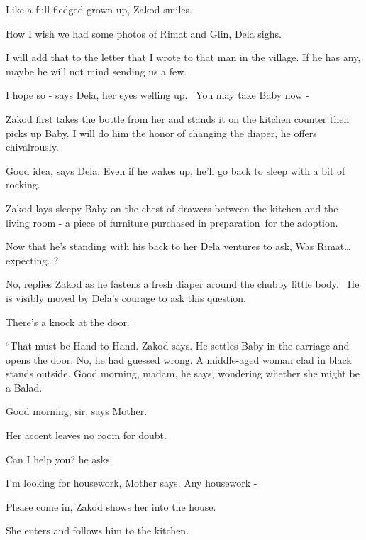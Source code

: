 \documentclass[letterpaper]{article}
\begin{document}
{\textquotedbl}Like a full-fledged grown up,{\textquotedbl} Zakod smiles. 

{\textquotedbl}How I wish we had some photos of Rimat and Glin,{\textquotedbl} Dela sighs.

{\textquotedbl}I will add that to the letter that I wrote to that man in the village. If he has any, maybe he will not
mind sending us a few.{\textquotedbl} 

{\textquotedbl}I hope so -{\textquotedbl} says Dela, her eyes welling up. ~{\textquotedbl}You may take Baby now
-{\textquotedbl} 

Zakod first takes the bottle from her and stands it on the kitchen counter then picks up Baby. {\textquotedbl}I will do
him the honor of changing the diaper,{\textquotedbl} he offers chivalrously.~

{\textquotedbl}Good idea,{\textquotedbl} says Dela. {\textquotedbl}Even if he wakes up, he'll go back to sleep with a
bit of rocking.{\textquotedbl} 

Zakod lays sleepy Baby on the chest of drawers between the kitchen and the living room - a piece of furniture purchased
in preparation~for the adoption.

Now that he's standing with his back to her Dela ventures to ask, {\textquotedbl}Was Rimat{\dots}
expecting{\dots}?{\textquotedbl} 

{\textquotedbl}No,{\textquotedbl} replies Zakod as he fastens a fresh diaper around the chubby little body.~ He is
visibly moved by Dela's courage to ask this question.

There's a knock at the door. 

{}``That must be Hand to Hand.{\textquotedbl} Zakod says. He settles Baby in the carriage and opens the door. No, he had
guessed wrong. A middle-aged\textcolor{red}{ }woman clad in black stands outside. {\textquotedbl}Good morning,
madam,{\textquotedbl} he says, wondering whether she might be a Balad.

{\textquotedbl}Good morning, sir,{\textquotedbl} says Mother. 

Her accent leaves no room for doubt.

{\textquotedbl}Can I help you?{\textquotedbl} he asks.

{\textquotedbl}I'm looking for housework,{\textquotedbl} Mother says. {\textquotedbl}Any housework -{\textquotedbl} 

{\textquotedbl}Please come in,{\textquotedbl} Zakod shows her into the house. 

She enters and follows him to the kitchen. 
\end{document}
